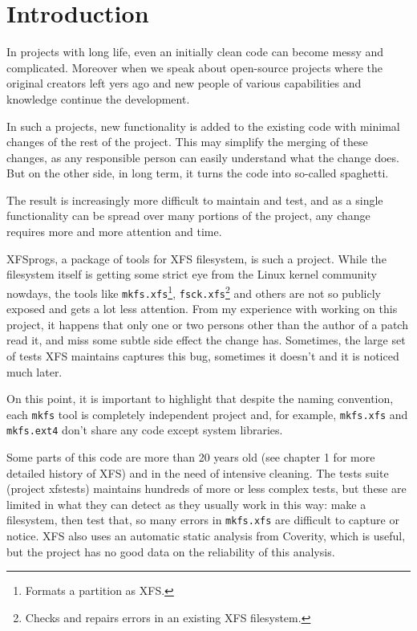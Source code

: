 
\chapter{Introduction}\label{chap:introduction}


In projects with long life, even an initially clean code can become messy and complicated. Moreover when we speak about open-source projects where the original creators left yers ago and new people of various capabilities and knowledge continue the development.

In such a projects, new functionality is added to the existing code with minimal changes of the rest of the project. This may simplify the merging of these changes, as any responsible person can easily understand what the change does. But on the other side, in long term, it turns the code into so-called spaghetti.

The result is increasingly more difficult to maintain and test, and as a single functionality can be spread over many portions of the project, any change requires more and more attention and time.

XFSprogs, a package of tools for XFS filesystem, is such a project. While the filesystem itself is getting some strict eye from the Linux kernel community nowdays, the tools like {\tt mkfs.xfs}\footnote{Formats a partition as XFS.}, {\tt fsck.xfs}\footnote{Checks and repairs errors in an existing XFS filesystem.} and others are not so publicly exposed and gets a lot less attention. From my experience with working on this project, it happens that only one or two persons other than the author of a patch read it, and miss some subtle side effect the change has. Sometimes, the large set of tests XFS maintains captures this bug, sometimes it doesn't and it is noticed much later.

On this point, it is important to highlight that despite the naming
convention, each {\tt mkfs} tool is completely independent project and, for
example, {\tt mkfs.xfs} and {\tt mkfs.ext4} don't share any code except
system libraries.

Some parts of this code are more than 20 years old (see chapter 1 for more detailed history of XFS) and in the need of intensive cleaning. The tests suite (project xfstests) maintains hundreds of more or less complex tests, but these are limited in what they can detect as they usually work in this way: make a filesystem, then test that, so many errors in {\tt mkfs.xfs} are difficult to capture or notice. XFS also uses an automatic static analysis from Coverity, which is useful, but the project has no good data on the reliability of this analysis.


